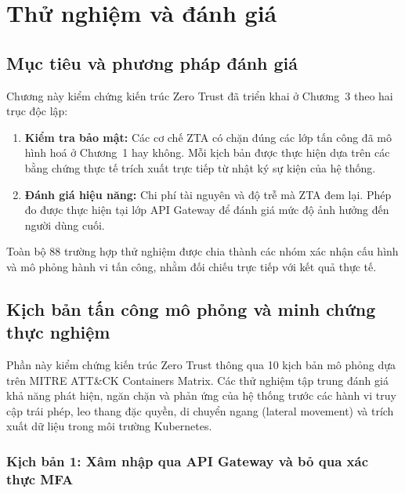 \chapter{Thử nghiệm và đánh giá}

\section{Mục tiêu và phương pháp đánh giá}
\label{sec:eval_objectives}

Chương này kiểm chứng kiến trúc Zero Trust đã triển khai ở Chương~3 theo hai trục độc lập:

\begin{enumerate}
    \item \textbf{Kiểm tra bảo mật:} Các cơ chế ZTA có chặn đúng các lớp tấn công đã mô hình hoá ở Chương~1 hay không. Mỗi kịch bản được thực hiện dựa trên các bằng chứng thực tế trích xuất trực tiếp từ nhật ký sự kiện của hệ thống.
    \item \textbf{Đánh giá hiệu năng:} Chi phí tài nguyên và độ trễ mà ZTA đem lại. Phép đo được thực hiện tại lớp API Gateway để đánh giá mức độ ảnh hưởng đến người dùng cuối.
\end{enumerate}

Toàn bộ 88 trường hợp thử nghiệm được chia thành các nhóm xác nhận cấu hình và mô phỏng hành vi tấn công, nhằm đối chiếu trực tiếp với kết quả thực tế.

\section{Kịch bản tấn công mô phỏng và minh chứng thực nghiệm}
\label{sec:test_scenarios}

Phần này kiểm chứng kiến trúc Zero Trust thông qua 10 kịch bản mô phỏng  dựa trên MITRE ATT\&CK Containers Matrix. Các thử nghiệm tập trung đánh giá khả năng phát hiện, ngăn chặn và phản ứng của hệ thống trước các hành vi truy cập trái phép, leo thang đặc quyền, di chuyển ngang (lateral movement) và trích xuất dữ liệu trong môi trường Kubernetes.

\subsection{Kịch bản 1: Xâm nhập qua API Gateway và bỏ qua xác thực MFA}
\label{subsec:kb1_gateway_mfa}

